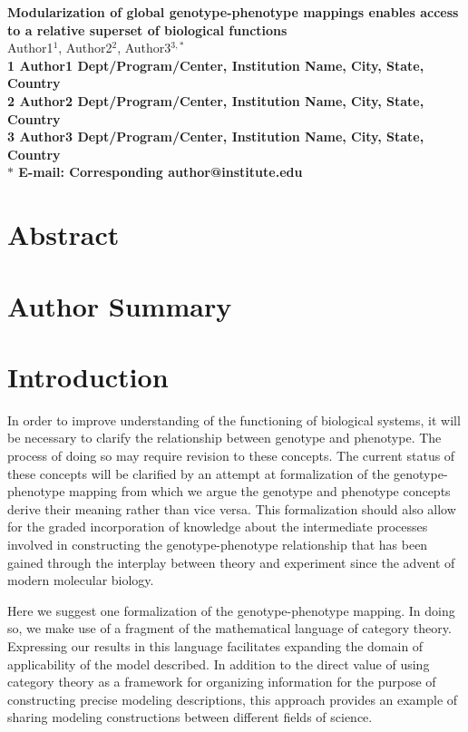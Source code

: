 \documentclass[10pt]{article}
\date{}
\begin{document}
\begin{flushleft}
{\Large
\textbf{Modularization of global genotype-phenotype mappings enables access to a relative superset of biological functions}
}
\\
Author1$^{1}$, 
Author2$^{2}$, 
Author3$^{3,\ast}$
\\
\bf{1} Author1 Dept/Program/Center, Institution Name, City, State, Country
\\
\bf{2} Author2 Dept/Program/Center, Institution Name, City, State, Country
\\
\bf{3} Author3 Dept/Program/Center, Institution Name, City, State, Country
\\
$\ast$ E-mail: Corresponding author@institute.edu
\end{flushleft}

\section*{Abstract}

\section*{Author Summary}

\section*{Introduction}
In order to improve understanding of the functioning of biological systems, it will be necessary to clarify the relationship between genotype and phenotype. The process of doing so may require revision to these concepts. The current status of these concepts will be clarified by an attempt at formalization of the genotype-phenotype mapping from which we argue the genotype and phenotype concepts derive their meaning rather than vice versa. This formalization should also allow for the graded incorporation of knowledge about the intermediate processes involved in constructing the genotype-phenotype relationship that has been gained through the interplay between theory and experiment since the advent of modern molecular biology.

Here we suggest one formalization of the genotype-phenotype mapping. In doing so, we make use of a fragment of the mathematical language of category theory. Expressing our results in this language facilitates expanding the domain of applicability of the model described. In addition to the direct value of using category theory as a framework for organizing information for the purpose of constructing precise modeling descriptions, this approach provides an example of sharing modeling constructions between different fields of science.
\end{document}
